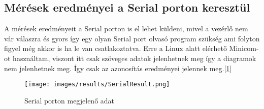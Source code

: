 \subsection{Mérések eredményei a Serial porton keresztül}

A mérések eredményeit a Serial porton is el lehet küldeni, mivel a 
vezérlő nem vár válaszra és gyors így egy olyan Serial port olvasó program
szükség ami folyton figyel még akkor is ha le van csatlakoztatva.
Erre a Linux alatt elérhető Minicom-ot használtam, viszont itt csak 
szöveges adatok jelenhetnek meg így a diagramok nem jelenhetnek meg.
Így csak az azonosítás eredményei jelennek meg.[\ref{fig:SerialRes}]


\begin{figure}[H]
    \centering
    \texttt{[image: images/results/SerialResult.png]}
    \caption{Serial porton megjelenő adat}
    \label{fig:SerialRes}
\end{figure}



